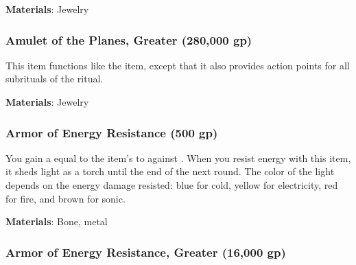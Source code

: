 \vspace{0.25em}
\textbf{Materials}: Jewelry


\lowercase{\hypertarget{item:Amulet of the Planes, Greater}{}}\label{item:Amulet of the Planes, Greater}
\hypertarget{item:Amulet of the Planes, Greater}{\subsubsection{Amulet of the Planes, Greater\hfill{} (280,000 gp)}}

This item functions like the  item, except that it also provides action points for all subrituals of the  ritual.



\vspace{0.25em}
\textbf{Materials}: Jewelry


\lowercase{\hypertarget{item:Armor of Energy Resistance}{}}\label{item:Armor of Energy Resistance}
\hypertarget{item:Armor of Energy Resistance}{\subsubsection{Armor of Energy Resistance\hfill{} (500 gp)}}

You gain a  equal to the item's  to  against .
When you resist energy with this item, it sheds light as a torch until the end of the next round.
The color of the light depends on the energy damage resisted: blue for cold, yellow for electricity, red for fire, and brown for sonic.



\vspace{0.25em}
\textbf{Materials}: Bone, metal


\lowercase{\hypertarget{item:Armor of Energy Resistance, Greater}{}}\label{item:Armor of Energy Resistance, Greater}
\hypertarget{item:Armor of Energy Resistance, Greater}{\subsubsection{Armor of Energy Resistance, Greater\hfill{} (16,000 gp)}}

